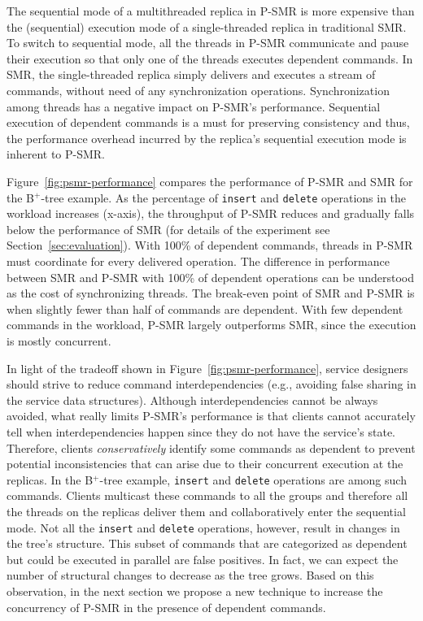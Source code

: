 \documentclass[conference]{IEEEtran}
\begin{document}
The sequential mode of a multithreaded replica in P-SMR is more expensive than the (sequential) execution mode of a single-threaded replica in traditional SMR. 
To switch to sequential mode, all the threads in P-SMR communicate and pause their execution so that only one of the threads executes dependent commands. 
In SMR, the single-threaded replica simply delivers and executes a stream of commands, without need of any synchronization operations.
Synchronization among threads has a negative impact on P-SMR's performance. 
Sequential execution of dependent commands is a must for preserving consistency and thus, the performance overhead incurred by the replica's sequential execution mode is inherent to P-SMR. 

Figure~\ref{fig:psmr-performance} compares the performance of P-SMR and SMR for the B$^+$-tree example. 
As the percentage of \texttt{insert} and \texttt{delete} operations in the workload increases (x-axis), the throughput of P-SMR reduces and gradually falls below the performance of SMR (for details of the experiment see Section~\ref{sec:evaluation}). With 100\% of dependent commands, threads in P-SMR must coordinate for every delivered operation.
The difference in performance between SMR and P-SMR with 100\% of dependent operations can be understood as the cost of synchronizing threads.
The break-even point of SMR and P-SMR is when slightly fewer than half of commands are dependent.
With few dependent commands in the workload, P-SMR largely outperforms SMR, since the execution is mostly concurrent.

In light of the tradeoff shown in Figure~\ref{fig:psmr-performance}, service designers should strive to reduce command interdependencies (e.g., avoiding false sharing in the service data structures).
Although interdependencies cannot be always avoided, what really limits P-SMR's performance is that clients cannot accurately tell when interdependencies happen since they do not have the service's state.
Therefore, clients \emph{conservatively} identify some commands as dependent to prevent potential inconsistencies that can arise due to their concurrent execution at the replicas. 
In the B$^+$-tree example, \texttt{insert} and \texttt{delete} operations are among such commands. Clients multicast these commands to all the groups and therefore all the threads on the replicas deliver them and collaboratively enter the sequential mode. 
Not all the \texttt{insert} and \texttt{delete} operations, however, result in changes in the tree's structure. 
This subset of commands that are categorized as dependent but could be executed in parallel are false positives. 
In fact, we can expect the number of structural changes to decrease as the tree grows.
Based on this observation, in the next section we propose a new technique to increase the concurrency of P-SMR in the presence of  dependent commands. 
\end{document}

